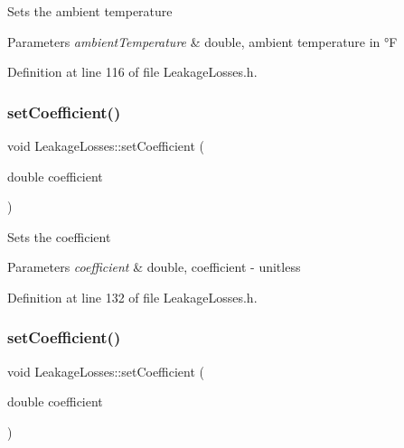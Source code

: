 Sets the ambient temperature 
\begin{DoxyParams}{Parameters}
{\em ambient\+Temperature} & double, ambient temperature in °F \\
\hline
\end{DoxyParams}


Definition at line 116 of file Leakage\+Losses.\+h.

\mbox{\label{class_leakage_losses_add2e96e75b6dd965370340dc03717434}} 
\subsubsection{\texorpdfstring{set\+Coefficient()}{setCoefficient()}\hspace{0.1cm}{\footnotesize\ttfamily [1/3]}}
{\footnotesize\ttfamily void Leakage\+Losses\+::set\+Coefficient (\begin{DoxyParamCaption}\item[{double}]{coefficient }\end{DoxyParamCaption})\hspace{0.3cm}{\ttfamily [inline]}}

Sets the coefficient 
\begin{DoxyParams}{Parameters}
{\em coefficient} & double, coefficient -\/ unitless \\
\hline
\end{DoxyParams}


Definition at line 132 of file Leakage\+Losses.\+h.

\mbox{\label{class_leakage_losses_add2e96e75b6dd965370340dc03717434}} 
\subsubsection{\texorpdfstring{set\+Coefficient()}{setCoefficient()}\hspace{0.1cm}{\footnotesize\ttfamily [2/3]}}
{\footnotesize\ttfamily void Leakage\+Losses\+::set\+Coefficient (\begin{DoxyParamCaption}\item[{double}]{coefficient }\end{DoxyParamCaption})\hspace{0.3cm}{\ttfamily [inline]}}

